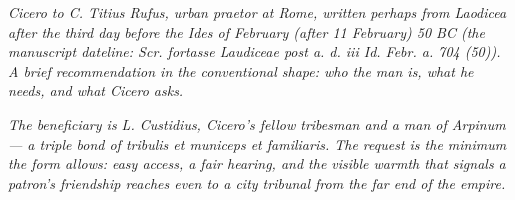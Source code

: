 
\textit{Cicero to C. Titius Rufus, urban praetor at Rome, written
perhaps from Laodicea after the third day before the Ides of February
(after 11 February) 50 BC (the manuscript dateline: \textit{Scr.
fortasse Laudiceae post a. d. iii Id. Febr. a. 704 (50)}). A brief
recommendation in the conventional shape: who the man is, what he
needs, and what Cicero asks.}

\textit{The beneficiary is L. Custidius, Cicero's fellow tribesman
and a man of Arpinum --- a triple bond of \textit{tribulis et
municeps et familiaris}. The request is the minimum the form allows:
easy access, a fair hearing, and the visible warmth that signals a
patron's friendship reaches even to a city tribunal from the far end
of the empire.}
